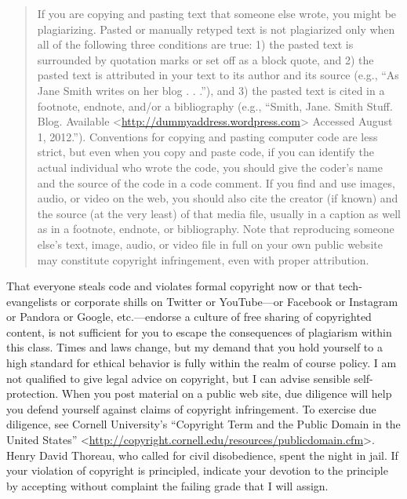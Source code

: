 \documentclass[]{article}
\begin{document}
\begin{quote}
If you are copying and pasting text that someone else wrote, you might
be plagiarizing. Pasted or manually retyped text is not plagiarized only
when all of the following three conditions are true: 1) the pasted text
is surrounded by quotation marks or set off as a block quote, and 2) the
pasted text is attributed in your text to its author and its source
(e.g., ``As Jane Smith writes on her blog . . .''), and 3) the pasted
text is cited in a footnote, endnote, and/or a bibliography (e.g.,
``Smith, Jane. Smith Stuff. Blog. Available
\textless{}\url{http://dummyaddress.wordpress.com}\textgreater{}
Accessed August 1, 2012.''). Conventions for copying and pasting
computer code are less strict, but even when you copy and paste code, if
you can identify the actual individual who wrote the code, you should
give the coder's name and the source of the code in a code comment. If
you find and use images, audio, or video on the web, you should also
cite the creator (if known) and the source (at the very least) of that
media file, usually in a caption as well as in a footnote, endnote, or
bibliography. Note that reproducing someone else's text, image, audio,
or video file in full on your own public website may constitute
copyright infringement, even with proper attribution.
\end{quote}

That everyone steals code and violates formal copyright now or that
tech-evangelists or corporate shills on Twitter or YouTube---or Facebook
or Instagram or Pandora or Google, etc.---endorse a culture of free
sharing of copyrighted content, is not sufficient for you to escape the
consequences of plagiarism within this class. Times and laws change, but
my demand that you hold yourself to a high standard for ethical behavior
is fully within the realm of course policy. I am not qualified to give
legal advice on copyright, but I can advise sensible self-protection.
When you post material on a public web site, due diligence will help you
defend yourself against claims of copyright infringement. To exercise
due diligence, see Cornell University's ``Copyright Term and the Public
Domain in the United States''
\textless{}\url{http://copyright.cornell.edu/resources/publicdomain.cfm}\textgreater{}.
Henry David Thoreau, who called for civil disobedience, spent the night
in jail. If your violation of copyright is principled, indicate your
devotion to the principle by accepting without complaint the failing
grade that I will assign.
\end{document}
